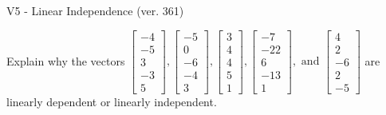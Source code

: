 \begin{exercise}
  \begin{exerciseTitle}V5 - Linear Independence (ver. 361)\end{exerciseTitle}
  \begin{exerciseStatement}
    Explain why the vectors \(\left[\begin{array}{r}
-4 \\
-5 \\
3 \\
-3 \\
5
\end{array}\right] , \left[\begin{array}{r}
-5 \\
0 \\
-6 \\
-4 \\
3
\end{array}\right] , \left[\begin{array}{r}
3 \\
4 \\
4 \\
5 \\
1
\end{array}\right] , \left[\begin{array}{r}
-7 \\
-22 \\
6 \\
-13 \\
1
\end{array}\right] , \text{ and } \left[\begin{array}{r}
4 \\
2 \\
-6 \\
2 \\
-5
\end{array}\right]\) are linearly dependent or linearly independent.	



\end{exerciseStatement}
\end{exercise}
